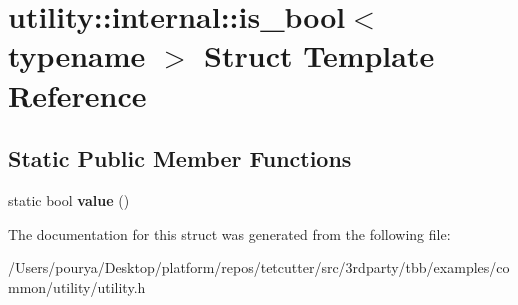 \hypertarget{structutility_1_1internal_1_1is__bool}{}\section{utility\+:\+:internal\+:\+:is\+\_\+bool$<$ typename $>$ Struct Template Reference}
\label{structutility_1_1internal_1_1is__bool}
\subsection*{Static Public Member Functions}
\begin{DoxyCompactItemize}
\item 
\hypertarget{structutility_1_1internal_1_1is__bool_a9e899b2b07167e9ac4e6e448db6de089}{}static bool {\bfseries value} ()\label{structutility_1_1internal_1_1is__bool_a9e899b2b07167e9ac4e6e448db6de089}

\end{DoxyCompactItemize}


The documentation for this struct was generated from the following file\+:\begin{DoxyCompactItemize}
\item 
/\+Users/pourya/\+Desktop/platform/repos/tetcutter/src/3rdparty/tbb/examples/common/utility/utility.\+h\end{DoxyCompactItemize}
